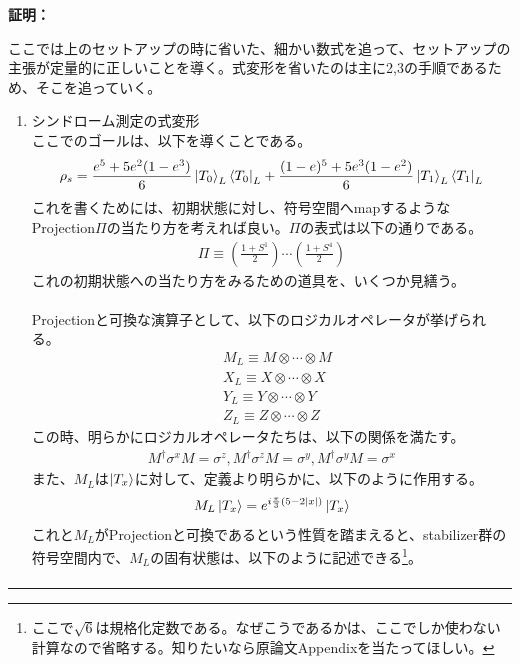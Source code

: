 \documentclass[a4paper,10.5pt]{article}
\numberwithin{equation}{section}
\newenvironment{proofbox}
{\begin{prooflabel}\textbf{証明：}\end{prooflabel}\vspace{0.8em}}
{\par\vspace{1em}\hrule\vspace{1em}}
\begin{document}
\begin{proofbox}
ここでは上のセットアップの時に省いた、細かい数式を追って、セットアップの主張が定量的に正しいことを導く。式変形を省いたのは主に2,3の手順であるため、そこを追っていく。
\begin{enumerate}
    \item シンドローム測定の式変形\\
    ここでのゴールは、以下を導くことである。
     \begin{align*}
            \rho_{s}=\frac{e^{5}+5e^{2}(1-e^{3})}{6}\ket{T_{0}}_{L}\bra{T_{0}}_{L}+\frac{(1-e)^{5}+5e^{3}(1-e^{2})}{6}\ket{T_{1}}_{L}\bra{T_{1}}_{L}
    \end{align*}
    これを書くためには、初期状態に対し、符号空間へmapするようなProjection$\Pi$の当たり方を考えれば良い。$\Pi$の表式は以下の通りである。
        \begin{align*}
            \Pi\equiv(\frac{1+S^{1}}{2})\cdots(\frac{1+S^{4}}{2})
        \end{align*}
    これの初期状態への当たり方をみるための道具を、いくつか見繕う。\\
    \\
    Projectionと可換な演算子として、以下のロジカルオペレータが挙げられる。
        \begin{align*}
            &M_{L}\equiv M\otimes \cdots \otimes M\\
            &X_{L}\equiv X\otimes \cdots \otimes X\\
            &Y_{L}\equiv Y\otimes \cdots \otimes Y\\
            &Z_{L}\equiv Z\otimes \cdots \otimes Z
        \end{align*}
    この時、明らかにロジカルオペレータたちは、以下の関係を満たす。
    \begin{align*}
    M^{\dagger}\sigma^{x}M=\sigma^{z},M^{\dagger}\sigma^{z}M=\sigma^{y},M^{\dagger}\sigma^{y}M=\sigma^{x}
    \end{align*}
    また、$M_{L}$は$\ket{T_{x}}$に対して、定義より明らかに、以下のように作用する。
    \begin{align*}
        M_{L}\ket{T_{x}}=e^{i\frac{\pi}{3}(5-2|x|)}\ket{T_{x}}
    \end{align*}
    これと$M_{L}$がProjectionと可換であるという性質を踏まえると、stabilizer群の符号空間内で、$M_{L}$の固有状態は、以下のように記述できる\footnote{ここで$\sqrt{6}$は規格化定数である。なぜこうであるかは、ここでしか使わない計算なので省略する。知りたいなら原論文Appendixを当たってほしい。}。
    \begin{align*}

\end{align*}
\end{enumerate}
\end{proofbox}
\end{document}
